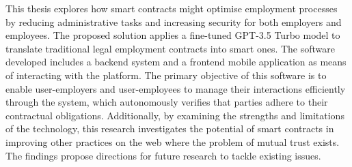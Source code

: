 This thesis explores how smart contracts might optimise employment processes by reducing administrative tasks and increasing security for both employers and employees. The proposed solution applies a fine-tuned GPT-3.5 Turbo model to translate traditional legal employment contracts into smart ones. The software developed includes a backend system and a frontend mobile application as means of interacting with the platform. The primary objective of this software is to enable user-employers and user-employees to manage their interactions efficiently through the system, which autonomously verifies that parties adhere to their contractual obligations. Additionally, by examining the strengths and limitations of the technology, this research investigates the potential of smart contracts in improving other practices on the web where the problem of mutual trust exists. The findings propose directions for future research to tackle existing issues.